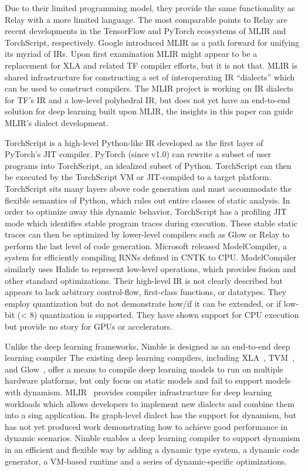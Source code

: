 Due to their limited programming model, they
    provide the same functionality as Relay with
    a more limited language.
The most comparable points to Relay are recent
    developments in the TensorFlow and PyTorch
    ecosystems of MLIR and TorchScript, respectively.
Google introduced MLIR as a path forward for
    unifying its myriad of IRs.
Upon first examination MLIR might appear to be
    a replacement for XLA and related TF compiler
    efforts, but it is not that.
MLIR is shared infrastructure for constructing
    a set of interoperating IR ``dialects'' which
    can be used to construct compilers.
The MLIR project is working on IR dialects
    for TF's IR and a low-level polyhedral IR,
    but does not yet have an end-to-end solution for
    deep learning built upon MLIR, the insights in
    this paper can guide MLIR's dialect development.

TorchScript is a high-level Python-like IR developed as the first
    layer of PyTorch's JIT compiler.
PyTorch (since v1.0) can rewrite a subset of user programs into
    TorchScript, an idealized subset of Python.
TorchScript can then be executed by the TorchScript VM or JIT-compiled to a target platform.
TorchScript sits many layers above code generation and must accommodate
    the flexible semantics of Python, which rules out entire classes of static analysis.
In order to optimize away this dynamic behavior, TorchScript has
    a profiling JIT mode which identifies stable program traces
    during execution.
These stable static traces can then be optimized by lower-level
    compilers such as Glow or Relay to perform the last level of code generation.
Microsoft released ModelCompiler, a system for efficiently compiling RNNs defined
    in CNTK to CPU.
ModelCompiler similarly uses Halide to represent low-level operations,
    which provides fusion and other standard optimizations.
Their high-level IR is not clearly described but appears to lack arbitrary
    control-flow, first-class functions, or datatypes.
They employ quantization but do not demonstrate how/if it can be extended,
    or if low-bit (< 8) quantization is supported.
They have shown support for CPU execution but provide no
    story for GPUs or accelerators.

Unlike the deep learning frameworks, Nimble is designed as an end-to-end deep learning compiler The existing deep learning compilers, including XLA~\citep{xla}, TVM~\citep{tvm_osdi18}, and Glow~\citep{glow}, offer a means to compile deep learning models to run on multiple hardware platforms, but only focus on static models and fail to support models with dynamism.
MLIR~\citep{lattner2020mlir} provides compiler infrastructure for deep learning workloads which allows developers to implement new dialects and combine them into a sing application. Its graph-level dialect has the support for dynamism, but has not yet produced work demonstrating how to achieve good performance in dynamic scenarios.
Nimble enables a deep learning compiler to support dynamism in an efficient and flexible way by adding a dynamic type system, a dynamic code generator, a VM-based runtime and a series of dynamic-specific optimizations.

